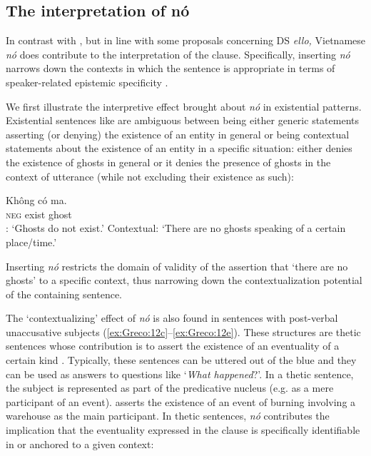 \documentclass[output=paper]{LSP/langsci}
\begin{document}
\subsection{The interpretation of nó}

In contrast with  , but in line with some proposals concerning DS \textit{ello,} Vietnamese \textit{nó} does contribute to the interpretation of the clause. Specifically, inserting \textit{nó} narrows down the contexts in which the sentence is appropriate in terms of speaker-related epistemic specificity \citep{GrecoEtAltoappear}.

We first illustrate the interpretive effect brought about \textit{nó} in existential patterns. Existential sentences like  are ambiguous between being either generic statements asserting (or denying) the existence of an entity in general or being contextual statements about the existence of an entity in a specific situation:  either denies the existence of ghosts in general or it denies the presence of ghosts in the context of utterance (while not excluding their existence as such):

\ea%
    \label{ex:Greco:13}
    \ea \gll Không    có  ma.\\
		  \textsc{neg}    exist  ghost\\
	\ex {}: ‘Ghosts do not exist.’
	\ex Contextual: ‘There are no ghosts speaking of a certain place/time.’
\z
\z

Inserting \textit{nó} restricts the domain of validity of the assertion that ‘there are no ghosts’ to a specific context, thus narrowing down the contextualization potential of the containing sentence.

\ea%
    \label{ex:Greco:14}
\z
\z

The ‘contextualizing’ effect of \textit{nó} is also found in sentences with post-verbal unaccusative subjects (\ref{ex:Greco:12c}--\ref{ex:Greco:12e}). These structures are thetic sentences whose  contribution is to assert the existence of an eventuality of a certain kind \citep{Ladusaw1994}. Typically, these sentences can be uttered out of the blue and they can be used as answers to questions like ‘\textit{What happened}?’. In a thetic sentence, the subject is represented as part of the predicative nucleus (e.g. as a mere participant of an event).  asserts the existence of an event of burning involving a warehouse as the main participant. In thetic sentences, \textit{nó} contributes the implication that the eventuality expressed in the clause is specifically identifiable in or anchored to a given context:
\end{document}
